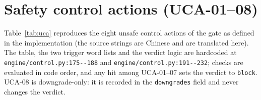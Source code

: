 
\appendix

\section{Safety control actions (UCA-01--08)}\label{sec:app:uca}

Table~\ref{tab:uca} reproduces the eight unsafe control actions of the
gate as defined in the implementation (the source strings are Chinese and are
translated here). The table, the two trigger word lists and the verdict logic are
hardcoded at
\texttt{engine/\allowbreak{}control.\allowbreak{}py:\allowbreak{}175-\allowbreak{}-\allowbreak{}188} and \texttt{engine/\allowbreak{}control.\allowbreak{}py:\allowbreak{}191-\allowbreak{}-\allowbreak{}232};
checks are evaluated in code order, and any hit among UCA-01--07 sets the
verdict to \texttt{block}. UCA-08 is downgrade-only: it is recorded in the
\texttt{downgrades} field and never changes the verdict.

